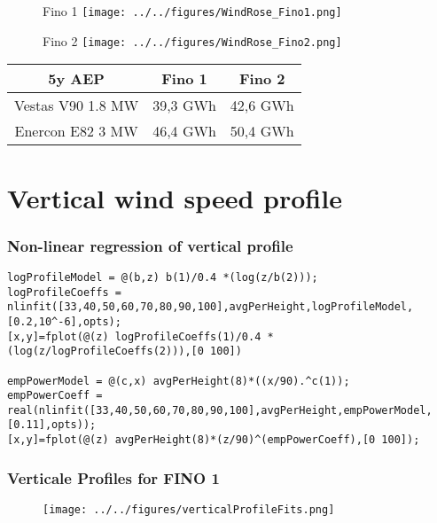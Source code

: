 \documentclass[12pt,t]{beamer}
\begin{document}
\begin{frame}
\begin{figure}[htbp]
	\begin{center}
		\begin{minipage}[t]{0.45\linewidth}
			\centering
			Fino 1
			\texttt{[image: ../../figures/WindRose\_Fino1.png]}
			
			
		\end{minipage}
		\begin{minipage}[t]{0.45\linewidth}
			\centering
			Fino 2
			\texttt{[image: ../../figures/WindRose\_Fino2.png]}

		\end{minipage}
	\end{center}
\end{figure}
\begin{tabular}{c| c| c}
			5y AEP 	& Fino 1 & Fino 2 \\ 
				\hline
			Vestas V90 1.8 MW & 39,3 GWh & 42,6 GWh \\
			\hline
			Enercon E82 3 MW& 46,4 GWh & 50,4 GWh \\
			\end{tabular}
\end{frame}


\section{Vertical wind speed profile}

\begin{frame}[fragile]
\frametitle{Non-linear regression of vertical profile}
\vspace{40 pt}
\begin{lstlisting}
logProfileModel = @(b,z) b(1)/0.4 *(log(z/b(2)));
logProfileCoeffs = nlinfit([33,40,50,60,70,80,90,100],avgPerHeight,logProfileModel,[0.2,10^-6],opts);
[x,y]=fplot(@(z) logProfileCoeffs(1)/0.4 *(log(z/logProfileCoeffs(2))),[0 100])

empPowerModel = @(c,x) avgPerHeight(8)*((x/90).^c(1));
empPowerCoeff = real(nlinfit([33,40,50,60,70,80,90,100],avgPerHeight,empPowerModel,[0.11],opts));
[x,y]=fplot(@(z) avgPerHeight(8)*(z/90)^(empPowerCoeff),[0 100]);
\end{lstlisting}
\end{frame}

\begin{frame}[fragile]
\frametitle{Verticale Profiles for FINO 1}
\begin{figure}[H]
\centering
\texttt{[image: ../../figures/verticalProfileFits.png]}
\label{fig:weatherpattern}
\end{figure}
\end{frame}
\end{document}
